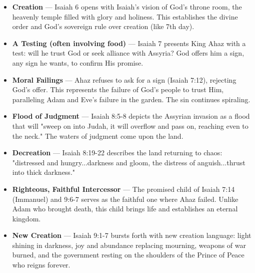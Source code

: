 \documentclass[11pt]{article}
\begin{document}
\vspace{1em}

\begin{itemize}
    \item \textbf{Creation} — Isaiah 6 opens with Isaiah's vision of God's throne room, the heavenly temple filled with glory and holiness. This establishes the divine order and God's sovereign rule over creation (like 7th day).

    \item \textbf{A Testing (often involving food)} — Isaiah 7 presents King Ahaz with a test: will he trust God or seek alliance with Assyria? God offers him a sign, any sign he wants, to confirm His promise.

    \item \textbf{Moral Failings} — Ahaz refuses to ask for a sign (Isaiah 7:12), rejecting God's offer. This represents the failure of God's people to trust Him, paralleling Adam and Eve's failure in the garden. The sin continues spiraling.

    \item \textbf{Flood of Judgment} — Isaiah 8:5-8 depicts the Assyrian invasion as a flood that will "sweep on into Judah, it will overflow and pass on, reaching even to the neck." The waters of judgment come upon the land.

    \item \textbf{Decreation} — Isaiah 8:19-22 describes the land returning to chaos: "distressed and hungry...darkness and gloom, the distress of anguish...thrust into thick darkness."

    \item \textbf{Righteous, Faithful Intercessor} — The promised child of Isaiah 7:14 (Immanuel) and 9:6-7 serves as the faithful one where Ahaz failed. Unlike Adam who brought death, this child brings life and establishes an eternal kingdom.

    \item \textbf{New Creation} — Isaiah 9:1-7 bursts forth with new creation language: light shining in darkness, joy and abundance replacing mourning, weapons of war burned, and the government resting on the shoulders of the Prince of Peace who reigns forever.
\end{itemize}

\newpage
\end{document}
